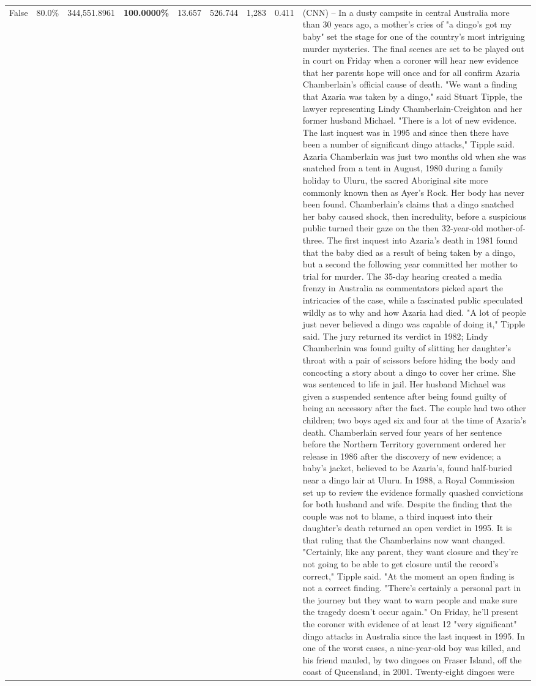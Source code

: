 \begin{table}[H]
\begin{tabular}{lllrlllll}
False & 80.0\% & 344,551.8961 & \bfseries \color{red} 100.0000\% & 13.657 & 526.744 & 1,283 & 0.411 & (CNN) -- In a dusty campsite in central Australia more than 30 years ago, a mother's cries of "a dingo's got my baby" set the stage for one of the country's most intriguing murder mysteries. The final scenes are set to be played out in court on Friday when a coroner will hear new evidence that her parents hope will once and for all confirm Azaria Chamberlain's official cause of death. "We want a finding that Azaria was taken by a dingo," said Stuart Tipple, the lawyer representing Lindy Chamberlain-Creighton and her former husband Michael. "There is a lot of new evidence. The last inquest was in 1995 and since then there have been a number of significant dingo attacks," Tipple said. Azaria Chamberlain was just two months old when she was snatched from a tent in August, 1980 during a family holiday to Uluru, the sacred Aboriginal site more commonly known then as Ayer's Rock. Her body has never been found. Chamberlain's claims that a dingo snatched her baby caused shock, then incredulity, before a suspicious public turned their gaze on the then 32-year-old mother-of-three. The first inquest into Azaria's death in 1981 found that the baby died as a result of being taken by a dingo, but a second the following year committed her mother to trial for murder. The 35-day hearing created a media frenzy in Australia as commentators picked apart the intricacies of the case, while a fascinated public speculated wildly as to why and how Azaria had died. "A lot of people just never believed a dingo was capable of doing it," Tipple said. The jury returned its verdict in 1982; Lindy Chamberlain was found guilty of slitting her daughter's throat with a pair of scissors before hiding the body and concocting a story about a dingo to cover her crime. She was sentenced to life in jail. Her husband Michael was given a suspended sentence after being found guilty of being an accessory after the fact. The couple had two other children; two boys aged six and four at the time of Azaria's death. Chamberlain served four years of her sentence before the Northern Territory government ordered her release in 1986 after the discovery of new evidence; a baby's jacket, believed to be Azaria's, found half-buried near a dingo lair at Uluru. In 1988, a Royal Commission set up to review the evidence formally quashed convictions for both husband and wife. Despite the finding that the couple was not to blame, a third inquest into their daughter's death returned an open verdict in 1995. It is that ruling that the Chamberlains now want changed. "Certainly, like any parent, they want closure and they're not going to be able to get closure until the record's correct," Tipple said. "At the moment an open finding is not a correct finding. "There's certainly a personal part in the journey but they want to warn people and make sure the tragedy doesn't occur again." On Friday, he'll present the coroner with evidence of at least 12 "very significant" dingo attacks in Australia since the last inquest in 1995. In one of the worst cases, a nine-year-old boy was killed, and his friend mauled, by two dingoes on Fraser Island, off the coast of Queensland, in 2001. Twenty-eight dingoes were 
\end{tabular}
\end{table}
